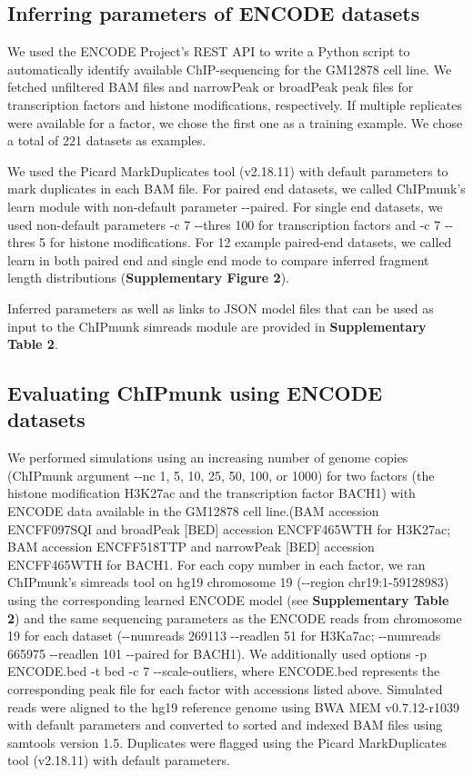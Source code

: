\documentclass[12pt]{article}
\begin{document}
\subsection*{Inferring parameters of ENCODE datasets}

We used the ENCODE Project's REST API to write a Python script to automatically identify available ChIP-sequencing for the GM12878 cell line.
We fetched unfiltered BAM files and narrowPeak or broadPeak peak files for transcription factors and histone modifications, respectively.
If multiple replicates were available for a factor, we chose the first one as a training example.
We chose a total of 221 datasets as examples.

We used the Picard \cite{picard} MarkDuplicates tool (v2.18.11) with default parameters to mark duplicates in each BAM file.
For paired end datasets, we called ChIPmunk's learn module with non-default parameter -{}-paired.
For single end datasets, we used non-default parameters -c 7 -{}-thres 100 for transcription factors and -c 7 -{}-thres 5 for histone modifications.
For 12 example paired-end datasets, we called learn in both paired end and single end mode to compare inferred fragment length distributions (\textbf{Supplementary Figure 2}).

Inferred parameters as well as links to JSON model files that can be used as input to the ChIPmunk simreads module are provided in \textbf{Supplementary Table 2}.

\subsection*{Evaluating ChIPmunk using ENCODE datasets}

We performed simulations using an increasing number of genome copies (ChIPmunk argument -{}-nc 1, 5, 10, 25, 50, 100, or 1000) for two factors (the histone modification H3K27ac and the transcription factor BACH1) with ENCODE data available in the GM12878 cell line.(BAM accession ENCFF097SQI and broadPeak [BED] accession ENCFF465WTH for H3K27ac; BAM accession ENCFF518TTP and narrowPeak [BED] accession ENCFF465WTH for BACH1.
For each copy number in each factor, we ran ChIPmunk's simreads tool on hg19 chromosome 19 (-{}-region chr19:1-59128983) using the corresponding learned ENCODE model (see \textbf{Supplementary Table 2}) and the same sequencing parameters as the ENCODE reads from chromosome 19 for each dataset (-{}-numreads 269113 -{}-readlen 51 for H3Ka7ac; -{}-numreads 665975 -{}-readlen 101 -{}-paired for BACH1). 
We additionally used options -p ENCODE.bed -t bed -c 7 -{}-scale-outliers, where ENCODE.bed represents the corresponding peak file for each factor with accessions listed above.
Simulated reads were aligned to the hg19 reference genome using BWA MEM \cite{bwamem} v0.7.12-r1039 with default parameters and converted to sorted and indexed BAM files using samtools \cite{samtools} version 1.5. Duplicates were flagged using the Picard \cite{picard} MarkDuplicates tool (v2.18.11) with default parameters.
\end{document}
